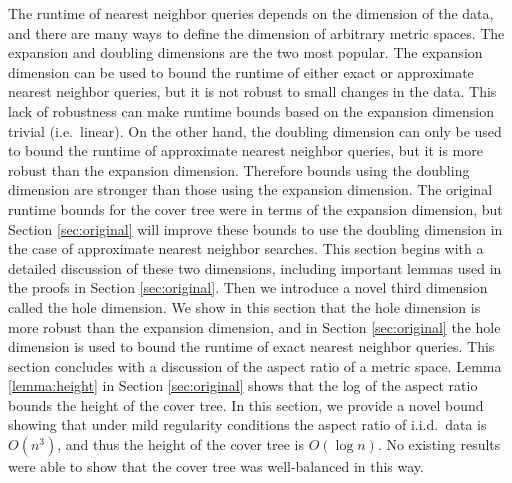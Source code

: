 \documentclass[thesis.tex]{subfiles}
\newcommand{\aspect}[1]{\Delta_{#1}}
\newcommand{\cdoub}{c_\textnormal{doub}}
\newcommand{\chole}{c_\textnormal{hole}}
\begin{document}
The runtime of nearest neighbor queries depends on the dimension of the data,
and there are many ways to define the dimension of arbitrary metric spaces.
The expansion and doubling dimensions are the two most popular. 
The expansion dimension can be used to bound the runtime of either exact or approximate nearest neighbor queries,
but it is not robust to small changes in the data.
This lack of robustness can make runtime bounds based on the expansion dimension trivial 
(i.e.\ linear).
On the other hand, 
the doubling dimension can only be used to bound the runtime of approximate nearest neighbor queries,
but it is more robust than the expansion dimension.
Therefore bounds using the doubling dimension are stronger than those using the expansion dimension.
The original runtime bounds for the cover tree were in terms of the expansion dimension,
but Section \ref{sec:original} will improve these bounds to use the doubling dimension in the case of approximate nearest neighbor searches.
This section begins with a detailed discussion of these two dimensions, 
including important lemmas used in the proofs in Section \ref{sec:original}.
Then we introduce a novel third dimension called the hole dimension.
We show in this section that the hole dimension is more robust than the expansion dimension,
and in Section \ref{sec:original} the hole dimension is used to bound the runtime of exact nearest neighbor queries.
This section concludes with a discussion of the aspect ratio of a metric space.
Lemma \ref{lemma:height} in Section \ref{sec:original} shows that the log of the aspect ratio bounds the height of the cover tree.
In this section, we provide a novel bound showing that under mild regularity conditions the aspect ratio of i.i.d.\ data is $O(n^3)$, 
and thus the height of the cover tree is $O(\log n)$.
No existing results were able to show that the cover tree was well-balanced in this way.

\end{document}
